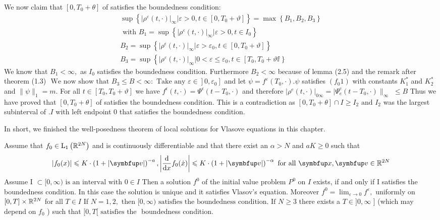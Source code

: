 \begin{lemma}
We now claim that $\left[0, T_{0}+\theta\right]$ of satisfies the boundedness condition: 
\[
\begin{array}{ll}
\sup \left\{\left|\rho^{\varepsilon}(t, \cdot)\right|_{\infty} | \varepsilon>0, t \in\left[0, T_{0}+\vartheta\right]\right\}=\max \left\{B_{1}, B_{2}, B_{3}\right\} \\
\text { with } B_{1}=\sup \left\{\left|\rho^{\varepsilon}(t, \cdot)\right|_{\infty} | \varepsilon>0, t \in I_{0}\right\} \\
B_{2}=\sup \left\{\left|\rho^{\epsilon}(t, \cdot)\right|_{\infty} | \varepsilon>\varepsilon_{0}, t \in\left[0, T_{0}+\vartheta\right]\right\} \\
B_{3}=\sup \left\{\left|\rho^{\varepsilon}(t, \cdot)\right|_{\infty} | 0<\varepsilon \leqslant \varepsilon_{0}, t \in\left[T_{0}, T_{0}+\vartheta \mathbb{f}\right\}\right.
\end{array}
\]
We know that $B_{1}<\infty,$ as $I_{0}$ satisfies the boundedness condition. Furthermore $B_{2}<\infty$ because of lemma (2.5) and the remark after theorem (1.3) $\left.\text { We now show that }\left.B_{3} \leqslant B<\infty: \text { Take any } \varepsilon \in\right] 0, \varepsilon_{0}\right]$ and let $\psi=f^{\varepsilon}\left(T_{0}, \cdot\right) . \psi$
satisfies $(f_{0} 1)$ with constants $K_{1}^{*}$ and $K_{2}^{*}$ and $\|\psi\|_{1}=m .$ For all $t \in\left[T_{0}, T_{0}+\vartheta\right]$ we have $f^{\epsilon}(t, \cdot)=\Psi^{\epsilon}\left(t-T_{0}, \cdot\right)$ and therefore $\left|\rho^{e}(t, \cdot)\right|_{0 \infty}=| \Psi_{e}^{e}\left(t-T_{0}, \cdot\right) \|_{\infty}$
$\leqslant B$
Thus we have proved that $\left[0, T_{0}+\theta\right]$ of satisfies the boundedness condition.  This is a contradiction as $\left[0, T_{0}+\theta\right] \cap I \geqslant I_{2} \text { and } I_{2}$ was the largest subinterval of .$I$ with left endpoint 0 that satisfies the boundedness condition.

In short, we finished the well-posedness theorem of local solutions for Vlasove equations in this chapter.

Assume that $f_{0} \in \mathrm{L}_{1}\left({\mathbb{R}}^{2 N}\right)$ and is continuously differentiable and that there
exist an $\alpha>N$ and $a K \geqslant 0$ such that
\[
|f_{0}(x)| \leqslant K \cdot\left(1+\left|\vv\right|\right)^{-a},\left|\frac{\mathrm{d}}{\mathrm{d} x} f_{0}(\dot{x})\right| \leqslant K \cdot\left(1+\left|\vv\right|\right)^{-\alpha} \text { for all }\vx, \vv\in \bbR^{2 N}
\]
Assume I $\subset[0, \infty)\text { is an interval with } 0 \in I$
Then a solution $f^{0}$ of the initial value problem $P^{0}$ on $I$ exists, if and only if I satisfies the boundedness condition. In this case the solution is unique and it satisfies Vlasov's equation. Moreover
$f^{0}=\lim _{\varepsilon \rightarrow 0} f^{\varepsilon},$ uniformly on $[0, T] \times {\mathbb{R}}^{2 N}$ for all $T \in I$
If $N=1,2,$ then $[0, \infty)\text { satisfies the boundedness condition. If } N \geqslant 3$ there exists a $T \in] 0, \infty$ ] (which may depend on $f_{0}$ ) such that $[0, T[ \text { satisfies the }$ boundedness condition.



\end{lemma}


